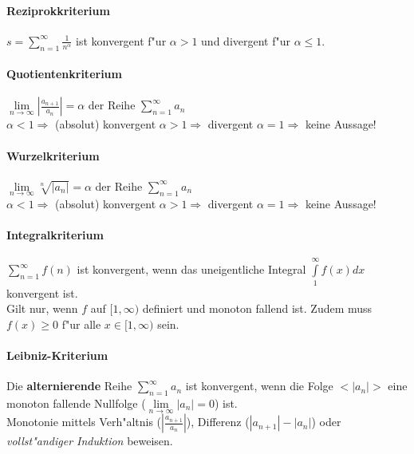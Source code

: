 \paragraph{Reziprokkriterium}
  $ s = \sum\limits_{n=1}^{\infty} \frac{1}{n^\alpha} $ ist konvergent f"ur
  $\alpha > 1$ und divergent f"ur $\alpha \leq 1$.

\paragraph{Quotientenkriterium}
  $ \lim\limits_{n \to \infty} \left|\frac{a_{n+1}}{a_n}\right| = \alpha $ der
Reihe $ \sum\limits_{n=1}^{\infty} a_n $ \\ $\alpha < 1 \Rightarrow$ (absolut) konvergent \hspace{3cm}
  $\alpha > 1 \Rightarrow$ divergent \hspace{4cm} 
  $\alpha = 1 \Rightarrow$ keine Aussage!

\paragraph{Wurzelkriterium}
  $ \lim\limits_{n \to \infty} \sqrt[n]{\left|a_n\right|} = \alpha $ der Reihe $
\sum\limits_{n=1}^{\infty} a_n $ \\ $\alpha < 1 \Rightarrow$ (absolut) konvergent\hspace{3cm}
  $\alpha > 1 \Rightarrow$ divergent \hspace{4cm} 
  $\alpha = 1 \Rightarrow$ keine Aussage!

\paragraph{Integralkriterium}
  $ \sum\limits_{n=1}^{\infty} f(n) $ ist konvergent, wenn das uneigentliche
Integral $ \int\limits_{1}^{\infty} f(x) dx $ konvergent ist. \\ Gilt nur, wenn $f$ auf $ [1, \infty) $ definiert und monoton fallend ist. Zudem muss $ f(x) \geq 0 $ f"ur alle $x \in [1, \infty)$ sein.
 
\paragraph{Leibniz-Kriterium}
  Die \textbf{alternierende} Reihe $ \sum\limits_{n=1}^{\infty} a_n $ ist
  konvergent, wenn die Folge $<\left|a_n\right|>$ eine monoton fallende Nullfolge ($\lim\limits_{n \to \infty} \left|a_n\right| = 0 $) ist. \\ 
  Monotonie mittels Verh"altnis ($ \left|\frac{a_{n+1}}{a_n}\right| $),
  Differenz ($ |a_{n+1}| - |a_n| $) oder \textit{vollst"andiger Induktion} beweisen.\\

